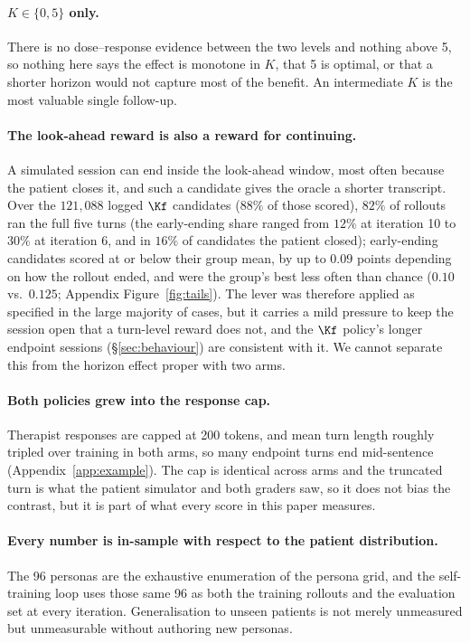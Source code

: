 \paragraph{$K \in \{0, 5\}$ only.}
There is no dose--response evidence between the two levels and nothing above 5, so nothing here
says the effect is monotone in $K$, that 5 is optimal, or that a shorter horizon would not capture
most of the benefit. An intermediate $K$ is the most valuable single follow-up.

\paragraph{The look-ahead reward is also a reward for continuing.}
A simulated session can end inside the look-ahead window, most often because the patient closes
it, and such a candidate gives the oracle a shorter transcript. Over the $121{,}088$ logged $\Kf$
candidates ($88\%$ of those scored), $82\%$ of rollouts ran the full five turns (the early-ending
share ranged from $12\%$ at iteration 10 to $30\%$ at iteration 6, and in $16\%$ of candidates the
patient closed);
early-ending candidates scored at or below their group mean, by up to $0.09$ points depending on
how the rollout ended, and were the group's best less often than chance ($0.10$ vs.\ $0.125$;
Appendix Figure~\ref{fig:tails}). The lever was therefore applied as specified in the large
majority of cases, but it carries a mild pressure to keep the session open that a turn-level
reward does not, and the $\Kf$ policy's longer endpoint sessions (\S\ref{sec:behaviour}) are
consistent with it. We cannot separate this from the horizon effect proper with two arms.

\paragraph{Both policies grew into the response cap.}
Therapist responses are capped at 200 tokens, and mean turn length roughly tripled over training in
both arms, so many endpoint turns end mid-sentence (Appendix~\ref{app:example}). The cap is
identical across arms and the truncated turn is what the patient simulator and both graders saw,
so it does not bias the contrast, but it is part of what every score in this paper measures.

\paragraph{Every number is in-sample with respect to the patient distribution.}
The 96 personas are the exhaustive enumeration of the persona grid, and the self-training loop uses
those same 96 as both the training rollouts and the evaluation set at every iteration.
Generalisation to unseen patients is not merely unmeasured but unmeasurable without authoring new
personas.

